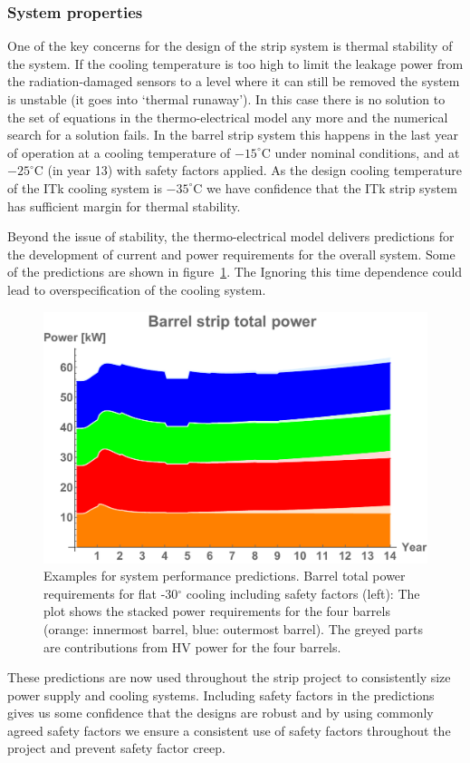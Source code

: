 \subsubsection{System properties}
One of the key concerns for the design of the strip system is thermal stability of the system. If the cooling temperature is too high to limit the leakage power from the radiation-damaged sensors to a level where it can still be removed the system is unstable (it goes into `thermal runaway'). In this case there is no solution to the set of equations in the thermo-electrical model any more and the numerical search for a solution fails. In the barrel strip system this happens in the last year of operation at a cooling temperature of $-15^\circ$C under nominal conditions, and at $-25^\circ$C (in year 13) with safety factors applied. As the design cooling temperature of the ITk cooling system is $-35^\circ$C we have confidence that the ITk strip system has sufficient margin for thermal stability.  

Beyond the issue of stability, the thermo-electrical model delivers predictions for the development of current and power requirements for the overall system. Some of the predictions are shown in figure~\ref{fig:systemperformance}. The Ignoring this time dependence could lead to overspecification of the cooling system.

\begin{figure}[ht]
\centering
\includegraphics[width=0.4\linewidth]{figures/Totalbarrelpower-30.pdf}
\caption{Examples for system performance predictions. Barrel total power requirements for flat -30$^\circ$ cooling including safety factors (left): The plot shows the stacked power requirements for the four barrels (orange: innermost barrel, blue: outermost barrel). The greyed parts are contributions from HV power for the four barrels.}
\label{fig:systemperformance}
\end{figure}

These predictions are now used throughout the strip project to consistently size power supply and cooling systems. Including safety factors in the predictions gives us some confidence that the designs are robust and by using commonly agreed safety factors we ensure a consistent use of safety factors throughout the project and prevent safety factor creep.  

